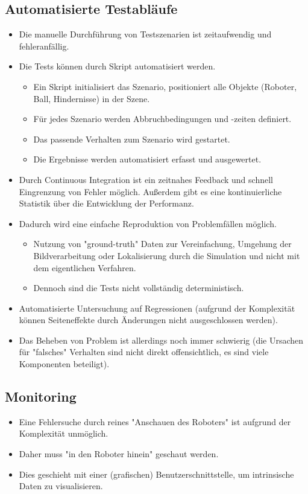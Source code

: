 		\subsection{Automatisierte Testabläufe}
			\begin{itemize}
				\item Die manuelle Durchführung von Testszenarien ist zeitaufwendig und fehleranfällig.
				\item Die Tests können \zB durch Skript automatisiert werden.
					\begin{itemize}
						\item Ein Skript initialisiert das Szenario, positioniert alle Objekte (Roboter, Ball, Hindernisse) in der Szene.
						\item Für jedes Szenario werden Abbruchbedingungen und -zeiten definiert.
						\item Das passende Verhalten zum Szenario wird gestartet.
						\item Die Ergebnisse werden automatisiert erfasst und ausgewertet.
					\end{itemize}
				\item Durch Continuous Integration ist ein zeitnahes Feedback und schnell Eingrenzung von Fehler möglich. Außerdem gibt es eine kontinuierliche Statistik über die Entwicklung der Performanz.
				\item Dadurch wird eine einfache Reproduktion von Problemfällen möglich.
					\begin{itemize}
						\item Nutzung von "ground-truth" Daten zur Vereinfachung, \zB Umgehung der Bildverarbeitung oder Lokalisierung durch die Simulation und nicht mit dem eigentlichen Verfahren.
						\item Dennoch sind die Tests nicht vollständig deterministisch.
					\end{itemize}
				\item Automatisierte Untersuchung auf Regressionen (aufgrund der Komplexität können Seiteneffekte durch Änderungen nicht ausgeschlossen werden).
				\item Das Beheben von Problem ist allerdings noch immer schwierig (die Ursachen für "falsches" Verhalten sind nicht direkt offensichtlich, es sind viele Komponenten beteiligt).
			\end{itemize}

		\subsection{Monitoring}
			\begin{itemize}
				\item Eine Fehlersuche durch reines "Anschauen des Roboters" ist aufgrund der Komplexität unmöglich.
				\item Daher muss "in den Roboter hinein" geschaut werden.
				\item Dies geschieht \bspw mit einer (grafischen) Benutzerschnittstelle, um intrinsische Daten zu visualisieren.
			\end{itemize}

